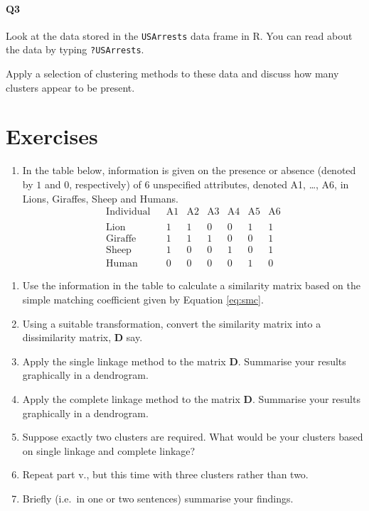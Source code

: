 \documentclass[
]{book}
\providecommand{\tightlist}{%
  \setlength{\itemsep}{0pt}\setlength{\parskip}{0pt}}
\theoremstyle{definition}
\theoremstyle{definition}
\theoremstyle{definition}
\theoremstyle{definition}
\theoremstyle{remark}
\begin{document}
\hypertarget{q3}{%
\paragraph*{Q3}\label{q3}}

Look at the data stored in the \texttt{USArrests} data frame in R. You can read about the data by typing \texttt{?USArrests}.

Apply a selection of clustering methods to these data and discuss how many clusters appear to be present.

\hypertarget{exercises-6}{%
\section{Exercises}\label{exercises-6}}

\begin{enumerate}
\def\labelenumi{\arabic{enumi}.}
\tightlist
\item
  In the table below, information is given on the presence or absence (denoted by \(1\) and \(0\), respectively) of \(6\) unspecified attributes, denoted A1, \ldots, A6, in Lions, Giraffes, Sheep and Humans.
  \[
  \begin{array}{cccccccc}
  \textrm{Individual}  &&\textrm{A1}&\textrm{A2}&\textrm{A3}&\textrm{A4}&\textrm{A5}&\textrm{A6}\\
  &&&&&&\\
  \textrm{Lion}&&1&1&0&0&1&1\\
  \textrm{Giraffe}&&1&1&1&0&0&1\\
  \textrm{Sheep}&&1&0&0&1&0&1\\
  \textrm{Human}&&0&0&0&0&1&0
  \end{array}
  \]
\end{enumerate}

\begin{enumerate}
\def\labelenumi{\roman{enumi}.}
\item
  Use the information in the table to calculate a similarity matrix based on the simple matching
  coefficient given by Equation \eqref{eq:smc}.
\item
  Using a suitable transformation, convert the similarity matrix into a dissimilarity matrix,
  \(\mathbf D\) say.
\item
  Apply the single linkage method to the matrix \(\mathbf D\). Summarise your results graphically in a dendrogram.
\item
  Apply the complete linkage method to the matrix \(\mathbf D\). Summarise your results graphically in a dendrogram.
\item
  Suppose exactly two clusters are required. What would be your clusters based on single
  linkage and complete linkage?
\item
  Repeat part v., but this time with three clusters rather than two.
\item
  Briefly (i.e.~in one or two sentences) summarise your findings.
\end{enumerate}
\end{document}
